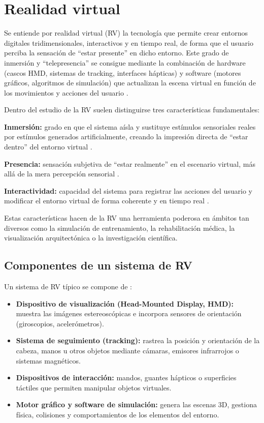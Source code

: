 \section{Realidad virtual}

Se entiende por realidad virtual (RV) la tecnología que permite crear entornos digitales tridimensionales, interactivos y en tiempo real, de forma que el usuario perciba la sensación de “estar presente” en dicho entorno. Este grado de inmersión y “telepresencia” se consigue mediante la combinación de hardware (cascos HMD, sistemas de tracking, interfaces hápticas) y software (motores gráficos, algoritmos de simulación) que actualizan la escena virtual en función de los movimientos y acciones del usuario \cite{steuer92,sherman2002}.

Dentro del estudio de la RV suelen distinguirse tres características fundamentales:

\textbf{Inmersión:} grado en que el sistema aísla y sustituye estímulos sensoriales reales por estímulos generados artificialmente, creando la impresión directa de “estar dentro” del entorno virtual \cite{milgram94}.

\textbf{Presencia:} sensación subjetiva de “estar realmente” en el escenario virtual, más allá de la mera percepción sensorial \cite{sherman2002,slater94}.

\textbf{Interactividad:} capacidad del sistema para registrar las acciones del usuario y modificar el entorno virtual de forma coherente y en tiempo real \cite{steuer92,milgram94}.

Estas características hacen de la RV una herramienta poderosa en ámbitos tan diversos como la simulación de entrenamiento, la rehabilitación médica, la visualización arquitectónica o la investigación científica.

\subsection{Componentes de un sistema de RV}

Un sistema de RV típico se compone de \cite{sherman2002,burdea2003}:
\begin{itemize}
  \item \textbf{Dispositivo de visualización (Head-Mounted Display, HMD):} muestra las imágenes estereoscópicas e incorpora sensores de orientación (giroscopios, acelerómetros).
  \item \textbf{Sistema de seguimiento (tracking):} rastrea la posición y orientación de la cabeza, manos u otros objetos mediante cámaras, emisores infrarrojos o sistemas magnéticos.
  \item \textbf{Dispositivos de interacción:} mandos, guantes hápticos o superficies táctiles que permiten manipular objetos virtuales.
  \item \textbf{Motor gráfico y software de simulación:} genera las escenas 3D, gestiona física, colisiones y comportamientos de los elementos del entorno.
\end{itemize}

